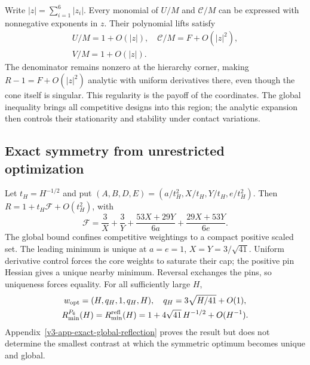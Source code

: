 \documentclass[aps,pre,reprint,amsmath,amssymb,longbibliography]{revtex4-2}
\newcommand{\refl}{\mathrm{refl}}
\begin{document}
Write $|z|=\sum_{i=1}^6|z_i|$. Every monomial of $U/M$ and $\mathcal C/M$ can be expressed with nonnegative
exponents in $z$. Their polynomial lifts satisfy
\begin{equation}
 \begin{gathered}
 U/M=1+O(|z|),\quad \mathcal C/M=F+O(|z|^2),\\
 V/M=1+O(|z|).
 \end{gathered}
 \label{eq:v4-toric-unit}
\end{equation}
The denominator remains nonzero at the hierarchy corner, making
$R-1=F+O(|z|^2)$ analytic with uniform derivatives there, even though
the cone itself is singular. This regularity is the payoff of the
coordinates. The global inequality brings all competitive designs
into this region; the analytic expansion then controls their
stationarity and stability under contact variations.

\subsection{Exact symmetry from unrestricted optimization}
\label{sec:v3-global-optimum}
Let $t_H=H^{-1/2}$ and put
$(A,B,D,E)=(a/t_H^2,X/t_H,Y/t_H,e/t_H^2)$. Then
$R=1+t_H\mathcal F+O(t_H^2)$, with
\begin{equation}
 \mathcal F=\frac3X+\frac3Y+
        \frac{53X+29Y}{6a}+\frac{29X+53Y}{6e}.
 \label{eq:v3-main-scaled-objective}
\end{equation}
The global bound confines competitive weightings to a compact positive
scaled set. The leading minimum is unique at $a=e=1$,
$X=Y=3/\sqrt{41}$. Uniform derivative control forces the core weights
to saturate their cap; the positive pin Hessian gives a unique nearby minimum.
Reversal exchanges the pins, so uniqueness forces equality. For all
sufficiently large $H$,
\begin{equation}
 \begin{gathered}
 w_{\rm opt}=(H,q_H,1,q_H,H),\quad
 q_H=3\sqrt{H/41}+O(1),\\
 R_{\min}^{P_6}(H)=R_{\min}^{\refl}(H)
       =1+4\sqrt{41}\,H^{-1/2}+O(H^{-1}).
 \end{gathered}
 \label{eq:p6-optimum}
\end{equation}
Appendix~\ref{v3-app-exact-global-reflection} proves the result but
does not determine the smallest contrast at which the symmetric
optimum becomes unique and global. 
\end{document}
